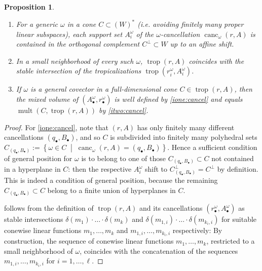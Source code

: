 \documentclass[a4paper]{article}
\newtheorem{proposition}{Proposition}
\theoremstyle{remark}
\newcommand{\setdes}[2]{\left\{#1\;\middle|\;#2\right\}}
\def\corn{\delta}
\DeclareMathOperator{\trop}{trop}
\DeclareMathOperator{\mult}{mult}
\DeclareMathOperator{\canc}{canc}
\begin{document}
\begin{proposition}
  \label{prop:cancel}
  \begin{enumerate}
  \item \label{ione:cancel} For a generic $\omega$ in a cone
    $C\subset (W)^*$ (i.e. avoiding finitely many proper linear subspaces),
    each support set $A^{\omega}_i$ of the $\omega$-cancellation
    $\canc_{\omega}(r,A)$ is contained in the orthogonal complement
    $C^\bot\subset W$ up to an affine shift.
  \item \label{itwo:cancel} In a small neighborhood of every such
    $\omega$, $\trop(r,A)$ coincides with the stable intersection of the
    tropicalizations $\trop(r_i^{\omega},A_i^{\omega})$.
  \item If $\omega$ is a general covector in a full-dimensional cone
    $C\in \trop(r,A)$, then the mixed volume of
    $(A^\omega_{\bullet},r^\omega_{\bullet})$ is well defined by \cref{ione:cancel} and equals
    $\mult(C,\trop(r,A))$ by \cref{itwo:cancel}.
  \end{enumerate}
\end{proposition}
\begin{proof}
  For \cref{ione:cancel}, note that $(r,A)$ has only finitely many
  different cancellations $(q_{\bullet},B_{\bullet})$, and so $C$ is subdivided
  into finitely many polyhedral sets
  $C_{(q_{\bullet},B_{\bullet})}:=\setdes{\omega\in C}{\canc_{\omega}(r,A) =
    (q_{\bullet},B_{\bullet})}$. Hence a sufficient condition of general position for
  $\omega$ is to belong to one of those
  $C_{(q_{\bullet},B_{\bullet})}\subset C$ not contained in a hyperplane in
  $C$: then the respective $A^\omega_i$ shift to
  $C_{(q_{\bullet},B_{\bullet})}^\perp=C^\perp$ by definition. This is indeed a condition of general
  position, because the remaining
  $C_{(q_{\bullet},B_{\bullet})}\subset C$ belong to a finite union of hyperplanes in
  $C$.

   follows from the definition of $\trop(r,A)$ and
  its cancellations $(r_{\bullet}^{\omega},A^\omega_{\bullet})$ as stable intersections
  $\corn(m_1)\cdot \hdots \cdot \corn(m_k)$ and
  $\corn(m_{1,i})\cdot \hdots \cdot \corn(m_{k_i,i})$ for suitable conewise
  linear functions $m_1,\hdots,m_k$ and $m_{1,i},\dots,m_{k_i,i}$
  respectively: By construction, the sequence of conewise linear
  functions $m_1,\hdots,m_k$, restricted to a small neighborhood of
  $\omega$, coincides with the concatenation of the sequences
  $m_{1,i},\ldots,m_{k_i,i}$ for $i = 1,\hdots, \ell$.
\end{proof}
\end{document}
